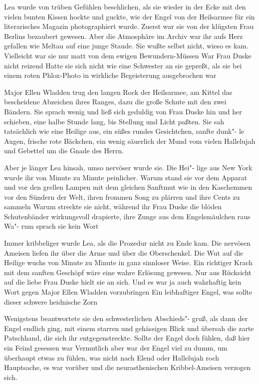 Lea wurde von trüben Gefühlen beschlichen, als sie wieder
in der Ecke mit den vielen bunten Kissen hockte und guckte,
wie der Engel von der Heilsarmee für ein literarisches Magazin
photographiert wurde. Zuerst war sie von der klügsten Frau
Berlins bezaubert gewesen. Aber die Atmosphäre im Archiv
war ihr aufs Herz gefallen wie Meltau\label{lS63-1} auf eine junge Staude.
Sie wußte selbst nicht, wieso es kam. Vielleicht war sie nur
matt von dem ewigen Bewundern-Müssen\frag{} War Frau Duske
nicht reizend\frag{} Hatte sie sich nicht wie eine Schwester an sie
gepreßt, als sie bei einem roten Phlox-Photo\label{lS63-2} in wirkliche
Begeisterung ausgebrochen war\frag{}

Major Ellen Wladden trug den langen Rock der Heilsarmee, am
Kittel das bescheidene Abzeichen ihres Ranges, dazu die große
Schute mit den zwei Bändern. Sie sprach wenig und ließ sich
geduldig von Frau Duske hin und her schieben, eine halbe
Stunde lang, bis Stellung und Licht paßten. Sie sah tatsächlich
wie eine Heilige aus, ein süßes rundes Gesichtchen, sanfte dunk"-%
le Augen, frische rote Bäckchen, ein wenig säuerlich der Mund
vom vielen Hallelujah und Gebettel um die Gnade des Herrn.

Aber je länger Lea hinsah, umso nervöser wurde sie. Die Hei"-%
lige aus New York wurde ihr von Minute zu Minute peinlicher.
Warum stand sie vor dem Apparat und vor den grellen
Lampen mit dem gleichen Sanftmut wie in den Kaschemmen
vor den Sündern der Welt, ihren frommen Song zu plärren
und ihre Cents zu sammeln\frag{} Warum streckte sie nicht, während
ihr Frau Duske die blöden Schutenbänder wirkungsvoll
drapierte, ihre Zunge aus dem Engelsmäulchen raus\frag{} Wa"-%
rum sprach sie kein Wort\frag{}

Immer kribbeliger wurde Lea, als die Prozedur nicht zu Ende
kam. Die nervösen Ameisen liefen ihr über die Arme und über
die Oberschenkel. Die Wut auf die Heilige wuchs von Minute
zu Minute in ganz sinnloser Weise. Ein richtiger Krach mit
dem sanften Geschöpf wäre eine wahre Erlösung gewesen.
Nur aus Rücksicht auf die liebe Frau Duske hielt sie an sich.
Und es war ja auch wahrhaftig kein Wort gegen Major Ellen
Wladden vorzubringen\frag{} Ein leibhaftiger Engel, was sollte
dieser schwere heidnische Zorn\frag{}

Wenigstens beantwortete sie den schwesterlichen Abschieds"-%
gruß, als dann der Engel endlich ging, mit einem starren und
gehässigen Blick und übersah die zarte Patschhand, die sich ihr
entgegenstreckte. Sollte der Engel doch fühlen, daß hier ein
Feind gesessen war\ausr{} Vermutlich aber war der Engel viel zu
dumm, um überhaupt etwas zu fühlen, was nicht nach Elend
oder Hallelujah roch\frag{} Hauptsache, es war vorüber und die
neurasthenischen Kribbel-Ameisen verzogen sich.

